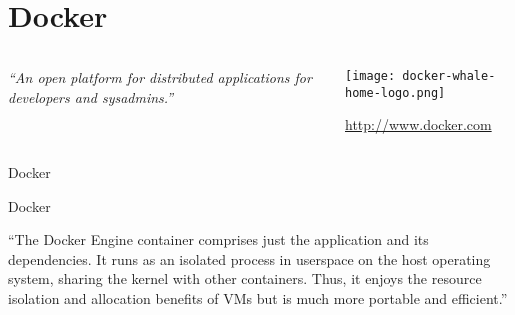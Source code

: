 \documentclass[presentation,c]{beamer}
\begin{document}
\section{Docker}
\label{sec-9}

{
\begin{frame}[label=sec-9-1]{}

\begin{columns}
\begin{column}{0.5\textwidth}

\textit{``An open platform for distributed applications for developers and sysadmins.''}
\end{column}

\begin{column}{0.5\textwidth}
\texttt{[image: docker-whale-home-logo.png]}

\url{http://www.docker.com}
\end{column}
\end{columns}
\end{frame}
} %

{
\begin{frame}[label=sec-9-2]{Docker}

\begin{block}{Docker}

``The Docker Engine container comprises just the application and its dependencies. It runs as an isolated process in userspace on the host operating system, sharing the kernel with other containers. Thus, it enjoys the resource isolation and allocation benefits of VMs but is much more portable and efficient.''
\end{block}
\end{frame}
} %
\end{document}
